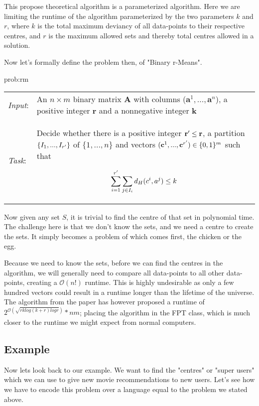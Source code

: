 \documentclass[a4paper]{article}
\begin{document}
This propose theoretical algorithm is a parameterized algorithm. Here we are limiting the runtime of the
algorithm parameterized by the two parameters $k$ and $r$, where $k$ is the total maximum deviancy 
of all data-points to their respective centres, and $r$ is the maximum allowed sets and 
thereby total centres allowed in a solution.

\newpage

Now let's formally define the problem then, of "Binary r-Means".
\begin{problem}{prob:rm}
\begin{tabular}{p{}p{}}
    \textit{Input}: & An $n \times m$ binary matrix \textbf{A} with columns
    ($\textbf{a}^1,...,\textbf{a}^n$), a positive integer $\textbf{r}$ and a nonnegative
    integer $\textbf{k}$                                                                     \\

    \textit{Task}:  & Decide whether there is a positive integer $\textbf{r}\sp{\prime} \leq
        \textbf{r}$, a partition $\{I_1, ..., I_{r\sp{\prime}}\}$ of $\{1,...,n\}$ and vectors
    $(\textbf{c}^1,...,\textbf{c}^{r\sp{\prime}}) \in \{0,1\}^m$ such that

    \[
        \sum_{i = 1}^{r\sp{\prime}} \sum_{j \in I_i} d_H(c^i, a^j) \leq k
    \]
\end{tabular}
\end{problem}

Now given any set $S$, it is trivial to find the centre of that set in polynomial time. The challenge
here is that we don't know the sets, and we need a centre to create the sets. It simply becomes a problem
of which comes first, the chicken or the egg.

Because we need to know the sets, before we can find the centres in the algorithm, we will
generally need to compare all data-points to all other data-points, creating a $\mathcal{O}(n!)$ runtime. This
is highly undesirable as only a few hundred vectors could result in a runtime longer than the lifetime
of the universe. The algorithm from the paper \cite{fomin_golovach_panolan_2020} has however proposed a 
runtime of $2^{\mathcal{O} (\sqrt{rk log(k+r) logr})}*nm$; placing the algorithm in the FPT class, which is
much closer to the runtime we might expect from normal computers.

\subsection{Example}
Now lets look back to our example. We want to find the "centres" or "super users" which we can use to 
give new movie recommendations to new users. Let's see how we have to encode this problem over a language
equal to the problem we stated above.
\end{document}
